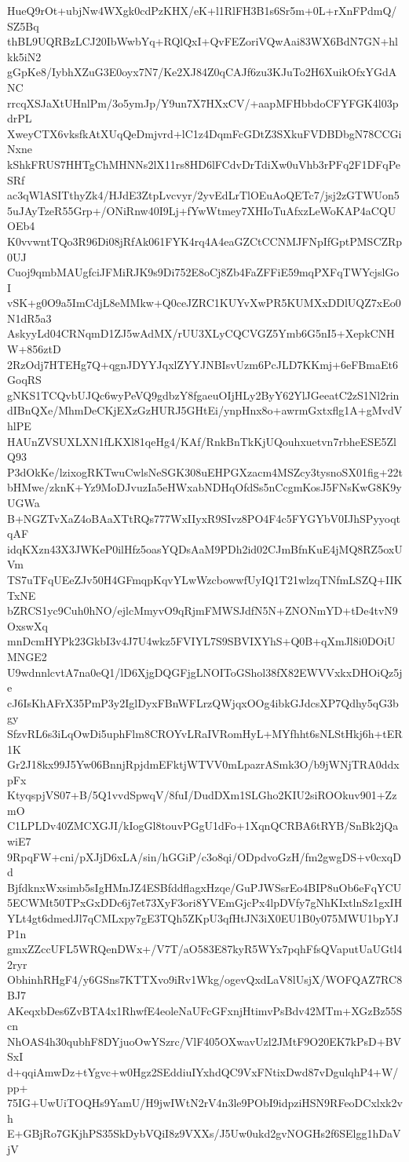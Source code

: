 HueQ9rOt+ubjNw4WXgk0cdPzKHX/eK+l1RlFH3B1s6Sr5m+0L+rXnFPdmQ/SZ5Bq
thBL9UQRBzLCJ20IbWwbYq+RQlQxI+QvFEZoriVQwAai83WX6BdN7GN+hlkk5iN2
gGpKe8/IybhXZuG3E0oyx7N7/Ke2XJ84Z0qCAJf6zu3KJuTo2H6XuikOfxYGdANC
rrcqXSJaXtUHnlPm/3o5ymJp/Y9un7X7HXxCV/+aapMFHbbdoCFYFGK4l03pdrPL
XweyCTX6vksfkAtXUqQeDmjvrd+lC1z4DqmFcGDtZ3SXkuFVDBDbgN78CCGiNxne
kShkFRUS7HHTgChMHNNs2lX11rs8HD6lFCdvDrTdiXw0uVhb3rPFq2F1DFqPeSRf
ac3qWlASITthyZk4/HJdE3ZtpLvcvyr/2yvEdLrTlOEuAoQETc7/jsj2zGTWUon5
5uJAyTzeR55Grp+/ONiRnw40I9Lj+fYwWtmey7XHIoTuAfxzLeWoKAP4aCQUOEb4
K0vvwntTQo3R96Di08jRfAk061FYK4rq4A4eaGZCtCCNMJFNpIfGptPMSCZRp0UJ
Cuoj9qmbMAUgfciJFMiRJK9s9Di752E8oCj8Zb4FaZFFiE59mqPXFqTWYcjslGoI
vSK+g0O9a5ImCdjL8eMMkw+Q0ceJZRC1KUYvXwPR5KUMXxDDlUQZ7xEo0N1dR5a3
AskyyLd04CRNqmD1ZJ5wAdMX/rUU3XLyCQCVGZ5Ymb6G5nI5+XepkCNHW+856ztD
2RzOdj7HTEHg7Q+qgnJDYYJqxlZYYJNBIsvUzm6PcJLD7KKmj+6eFBmaEt6GoqRS
gNKS1TCQvbUJQc6wyPeVQ9gdbzY8fgaeuOIjHLy2ByY62YlJGeeatC2zS1Nl2rin
dIBnQXe/MhmDeCKjEXzGzHURJ5GHtEi/ynpHnx8o+awrmGxtxflg1A+gMvdVhlPE
HAUnZVSUXLXN1fLKXl81qeHg4/KAf/RnkBnTkKjUQouhxuetvn7rbheESE5ZlQ93
P3dOkKe/lzixogRKTwuCwlsNeSGK308uEHPGXzacm4MSZcy3tysnoSX01fig+22t
bHMwe/zknK+Yz9MoDJvuzIa5eHWxabNDHqOfdSs5nCcgmKosJ5FNsKwG8K9yUGWa
B+NGZTvXaZ4oBAaXTtRQs777WxIIyxR9SIvz8PO4F4c5FYGYbV0IJhSPyyoqtqAF
idqKXzn43X3JWKeP0ilHfz5oasYQDsAaM9PDh2id02CJmBfnKuE4jMQ8RZ5oxUVm
TS7uTFqUEeZJv50H4GFmqpKqvYLwWzcbowwfUyIQ1T21wlzqTNfmLSZQ+IIKTxNE
bZRCS1yc9Cuh0hNO/ejlcMmyvO9qRjmFMWSJdfN5N+ZNONmYD+tDe4tvN9OxswXq
mnDcmHYPk23GkbI3v4J7U4wkz5FVIYL7S9SBVIXYhS+Q0B+qXmJl8i0DOiUMNGE2
U9wdnnlcvtA7na0eQ1/lD6XjgDQGFjgLNOIToGShol38fX82EWVVxkxDHOiQz5je
cJ6IsKhAFrX35PmP3y2IglDyxFBnWFLrzQWjqxOOg4ibkGJdcsXP7Qdhy5qG3bgy
SfzvRL6s3iLqOwDi5uphFlm8CROYvLRaIVRomHyL+MYfhht6sNLStHkj6h+tER1K
Gr2J18kx99J5Yw06BnnjRpjdmEFktjWTVV0mLpazrASmk3O/b9jWNjTRA0ddxpFx
KtyqspjVS07+B/5Q1vvdSpwqV/8fuI/DudDXm1SLGho2KIU2siROOkuv901+ZzmO
C1LPLDv40ZMCXGJI/kIogGl8touvPGgU1dFo+1XqnQCRBA6tRYB/SnBk2jQawiE7
9RpqFW+cni/pXJjD6xLA/sin/hGGiP/c3o8qi/ODpdvoGzH/fm2gwgDS+v0cxqDd
BjfdknxWxsimb5sIgHMnJZ4ESBfddflagxHzqe/GuPJWSsrEo4BIP8uOb6eFqYCU
5ECWMt50TPxGxDDc6j7et73XyF3ori8YVEmGjcPx4lpDVfy7gNhKIxtlnSz1gxIH
YLt4gt6dmedJl7qCMLxpy7gE3TQh5ZKpU3qfHtJN3iX0EU1B0y075MWU1bpYJP1n
gmxZZccUFL5WRQenDWx+/V7T/aO583E87kyR5WYx7pqhFfsQVaputUaUGtl42ryr
ObhinhRHgF4/y6GSns7KTTXvo9iRv1Wkg/ogevQxdLaV8lUsjX/WOFQAZ7RC8BJ7
AKeqxbDes6ZvBTA4x1RhwfE4eoleNaUFcGFxnjHtimvPsBdv42MTm+XGzBz55Scn
NhOAS4h30qubhF8DYjuoOwYSzrc/VlF405OXwavUzl2JMtF9O20EK7kPsD+BVSxI
d+qqiAmwDz+tYgvc+w0Hgz2SEddiuIYxhdQC9VxFNtixDwd87vDgulqhP4+W/pp+
75IG+UwUiTOQHs9YamU/H9jwIWtN2rV4n3le9PObI9idpziHSN9RFeoDCxlxk2vh
E+GBjRo7GKjhPS35SkDybVQiI8z9VXXs/J5Uw0ukd2gvNOGHs2f6SElgg1hDaVjV
